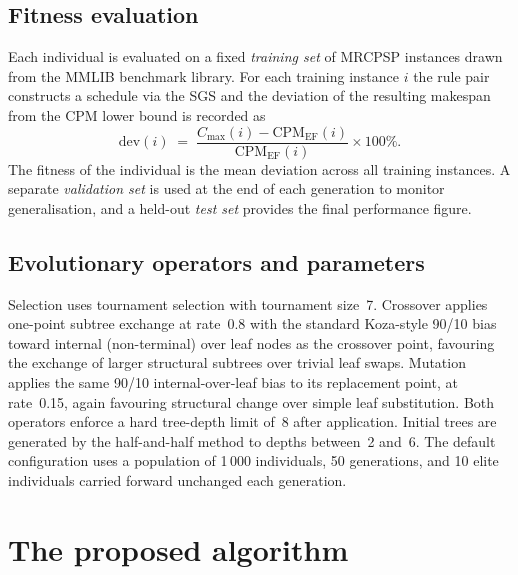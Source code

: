 \subsection{Fitness evaluation}
\label{subsec:fitness-evaluation}

Each individual is evaluated on a fixed \emph{training set} of MRCPSP instances drawn from the MMLIB benchmark library.
For each training instance $i$ the rule pair constructs a schedule via the SGS and the deviation of the resulting makespan from the CPM lower bound is recorded as
\[
    \mathrm{dev}(i) \;=\; \frac{C_{\max}(i) - \mathrm{CPM}_{\mathrm{EF}}(i)}{\mathrm{CPM}_{\mathrm{EF}}(i)} \times 100\%.
\]
The fitness of the individual is the mean deviation across all training instances.
A separate \emph{validation set} is used at the end of each generation to monitor generalisation, and a held-out \emph{test set} provides the final performance figure.

\subsection{Evolutionary operators and parameters}
\label{subsec:evolutionary-operators}

Selection uses tournament selection with tournament size~7.
Crossover applies one-point subtree exchange at rate~0.8 with the standard Koza-style 90/10 bias toward internal (non-terminal) over leaf nodes as the crossover point, favouring the exchange of larger structural subtrees over trivial leaf swaps.
Mutation applies the same 90/10 internal-over-leaf bias to its replacement point, at rate~0.15, again favouring structural change over simple leaf substitution.
Both operators enforce a hard tree-depth limit of~8 after application.
Initial trees are generated by the half-and-half method to depths between~2 and~6.
The default configuration uses a population of 1\,000 individuals, 50 generations, and 10 elite individuals carried forward unchanged each generation.

\section{The proposed algorithm}
\label{sec:proposed-algorithm}

